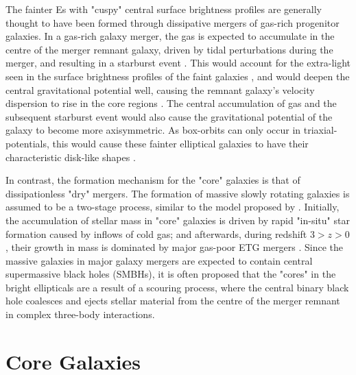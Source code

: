 \documentclass[english, twoside]{HYgradu}
\begin{document}
The fainter Es with "cuspy" central surface brightness profiles are generally thought to have been formed through dissipative mergers of gas-rich progenitor galaxies. In a gas-rich galaxy merger, the gas is expected to accumulate in the centre of the merger remnant galaxy, driven by tidal perturbations during the merger, and resulting in a starburst event \citep{Barnes1991}. This would account for the extra-light seen in the surface brightness profiles of the faint galaxies \citep{Hopkins2008}, and would deepen the central gravitational potential well,  causing the remnant galaxy's velocity dispersion to rise in the core regions \citep{Barnes1996}. The central accumulation of gas and the subsequent starburst event would also cause the gravitational potential of the galaxy to become more axisymmetric. As box-orbits can only occur in triaxial-potentials, this would cause these fainter elliptical galaxies to have their characteristic disk-like shapes \citep{Naab2006}.

In contrast, the formation mechanism for the "core" galaxies is that of dissipationless "dry" mergers. The formation of massive slowly rotating galaxies is assumed to be a two-stage process, similar to the model proposed by \cite{Oser2010}. Initially, the accumulation of stellar mass in "core" galaxies is driven by rapid "in-situ" star formation caused by inflows of cold gas; and afterwards, during redshift $3 > z > 0$, their growth in mass is dominated by major gas-poor ETG mergers \citep{Naab2009}. Since the massive galaxies in major galaxy mergers are expected to contain central supermassive black holes (SMBHs), it is often proposed that the "cores" in the bright ellipticals are a result of a scouring process, where the central binary black hole coalesces and ejects stellar material from the centre of the merger remnant in complex three-body interactions.

\section{Core Galaxies} \label{section:core_galaxies}
\end{document}
